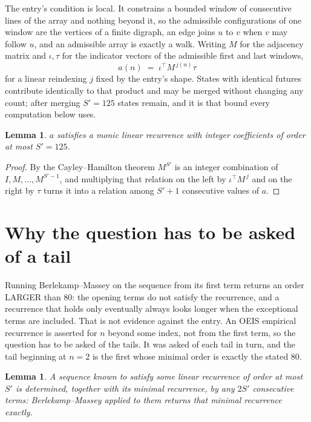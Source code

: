 \documentclass[11pt,a4paper]{article}
\theoremstyle{plain}
\newtheorem{lemma}[theorem]{Lemma}
\theoremstyle{definition}
\begin{document}
The entry's condition is local. It constrains a bounded window of consecutive lines of the
array and nothing beyond it, so the admissible configurations of one window are the vertices of
a finite digraph, an edge joins $u$ to $v$ when $v$ may follow $u$, and an admissible array is
exactly a walk. Writing $M$ for the adjacency matrix and $\iota,\tau$ for the indicator vectors
of the admissible first and last windows,
\[
a(n)\;=\;\iota^{\!\top}M^{\,j(n)}\tau
\]
for a linear reindexing $j$ fixed by the entry's shape. States with identical futures
contribute identically to that product and may be merged without changing any count; after
merging $S'=125$ states remain, and it is that bound every computation below uses.

\begin{lemma}\label{lem:cf}
$a$ satisfies a monic linear recurrence with integer coefficients of order at most $S'=125$.
\end{lemma}

\begin{proof}
By the Cayley--Hamilton theorem $M^{S'}$ is an integer combination of $I,M,\dots,M^{S'-1}$,
and multiplying that relation on the left by $\iota^{\!\top}M^{\,j}$ and on the right by
$\tau$ turns it into a relation among $S'+1$ consecutive values of $a$.
\end{proof}

\section{Why the question has to be asked of a tail}

Running Berlekamp--Massey on the sequence from its first term returns an order LARGER than $80$: the opening terms do not satisfy the recurrence, and a recurrence that holds only eventually always looks longer when the exceptional terms are included. That is not evidence against the entry. An OEIS empirical recurrence is asserted for $n$ beyond some index, not from the first term, so the question has to be asked of the tails. It was asked of each tail in turn, and the tail beginning at $n=2$ is the first whose minimal order is exactly the stated $80$.

\begin{lemma}\label{lem:bm}
A sequence known to satisfy some linear recurrence of order at most $S'$ is determined,
together with its minimal recurrence, by any $2S'$ consecutive terms: Berlekamp--Massey applied
to them returns that minimal recurrence exactly.
\end{lemma}
\end{document}
